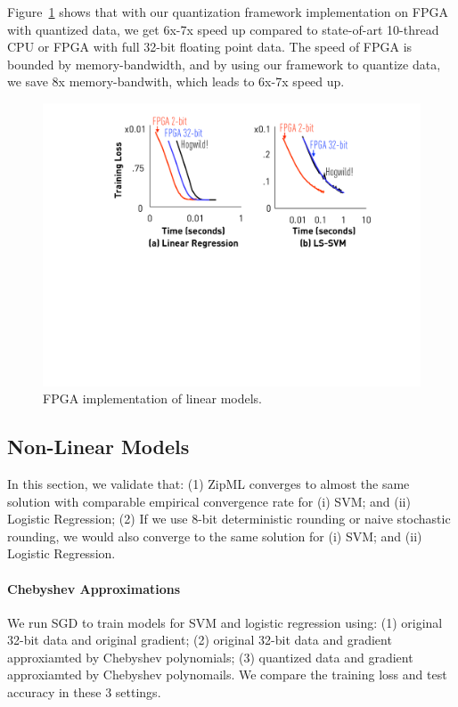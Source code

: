 \documentclass{article}
\begin{document}
Figure~\ref{fig:speedup} shows that with our quantization framework
implementation on FPGA with quantized data, 
we get 6x-7x speed up compared to state-of-art
10-thread CPU or FPGA with full 32-bit floating point data. The speed of FPGA is bounded by memory-bandwidth, and by using our framework to quantize data, we save 8x memory-bandwith, which leads to 6x-7x speed up.
\begin{figure}[t]
\centering
\includegraphics[width=\columnwidth]{final-experiments/linear-fpga} 
\caption{FPGA implementation of linear models.}
\label{fig:speedup}
\end{figure}

\subsection{Non-Linear Models}
In this section, we validate that: (1) ZipML 
converges to almost the same solution with comparable
empirical convergence rate for (i) SVM;
and (ii) Logistic Regression;
(2) If we use 8-bit deterministic rounding or naive stochastic rounding, we would also converge to the same solution for (i) SVM;
and (ii) Logistic Regression.

\paragraph{Chebyshev Approximations}
We run SGD to train models for SVM and logistic regression using:
(1) original 32-bit data and original gradient; (2) original 32-bit data and gradient approxiamted by Chebyshev polynomials;
(3) quantized data and gradient approxiamted by Chebyshev polynomails.
We compare the training loss and test accuracy in these 3 settings.
\end{document}
